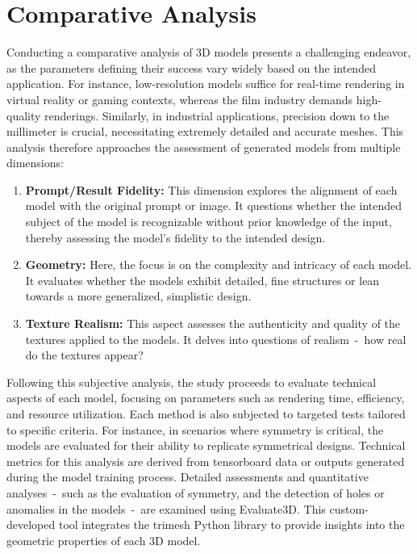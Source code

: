 \section{Comparative Analysis}\label{comparativeAnalysis}

Conducting a comparative analysis of 3D models presents a challenging endeavor, as the parameters defining their success vary widely based on the intended application. For instance, low-resolution models suffice for real-time rendering in virtual reality or gaming contexts, whereas the film industry demands high-quality renderings. Similarly, in industrial applications, precision down to the millimeter is crucial, necessitating extremely detailed and accurate meshes. This analysis therefore approaches the assessment of generated models from multiple dimensions:

\begin{enumerate}
    \item \textbf{Prompt/Result Fidelity:} This dimension explores the alignment of each model with the original prompt or image. It questions whether the intended subject of the model is recognizable without prior knowledge of the input, thereby assessing the model's fidelity to the intended design.
    \item \textbf{Geometry:} Here, the focus is on the complexity and intricacy of each model. It evaluates whether the models exhibit detailed, fine structures or lean towards a more generalized, simplistic design. 
    \item \textbf{Texture Realism:} This aspect assesses the authenticity and quality of the textures applied to the models. It delves into questions of realism~-~how real do the textures appear?
\end{enumerate}

Following this subjective analysis, the study proceeds to evaluate technical aspects of each model, focusing on parameters such as rendering time, efficiency, and resource utilization. Each method is also subjected to targeted tests tailored to specific criteria. For instance, in scenarios where symmetry is critical, the models are evaluated for their ability to replicate symmetrical designs. Technical metrics for this analysis are derived from tensorboard data or outputs generated during the model training process. Detailed assessments and quantitative analyses~-~such as the evaluation of symmetry, and the detection of holes or anomalies in the models~-~are examined using Evaluate3D. This custom-developed tool integrates the trimesh Python library \citep{trimesh} to provide insights into the geometric properties of each 3D model.



 
    
    
    